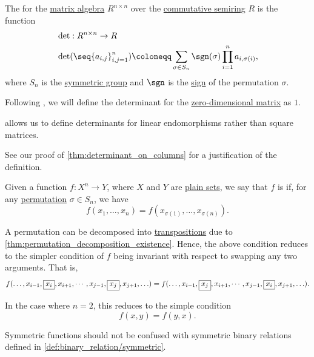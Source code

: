 \begin{definition}\label{def:matrix_determinant}
  The  for the \hyperref[thm:matrix_algebra]{matrix algebra} \( R^{n \times n} \) over the \hyperref[def:semiring/commutative]{commutative semiring} \( R \) is the function
  \begin{equation}\label{eq:def:matrix_determinant}
    \begin{aligned}
      &\det: R^{n \times n} \to R \\
      &\det(\seq{ a_{i,j} }_{i,j=1}^n) \coloneqq \sum_{\sigma \in S_n} \sgn(\sigma) \prod_{i=1}^n a_{i,\sigma(i)},
    \end{aligned}
  \end{equation}
  where \( S_n \) is the \hyperref[def:symmetric_group]{symmetric group} and \( \sgn \) is the \hyperref[def:permutation_parity]{sign} of the permutation \( \sigma \).

  Following \textcite[493]{Eisenbud1995CommutativeAlgebra}, we will define the determinant for the \hyperref[ex:def:array/zero_dimensional]{zero-dimensional matrix} as \( 1 \).

   allows us to define determinants for linear endomorphisms rather than square matrices.

  See our proof of \cref{thm:determinant_on_columns} for a justification of the definition.
\end{definition}

\begin{definition}\label{def:symmetric_function}
  Given a function \( f: X^n \to Y \), where \( X \) and \( Y \) are \hyperref[def:set]{plain sets}, we say that \( f \) is  if, for any \hyperref[def:symmetric_group]{permutation} \( \sigma \in S_n \), we have
  \begin{equation*}
    f(x_1, \ldots, x_n) = f(x_{\sigma(1)}, \ldots, x_{\sigma(n)}).
  \end{equation*}

  A permutation can be decomposed into \hyperref[def:cyclic_permutation]{transpositions} due to \cref{thm:permutation_decomposition_existence}. Hence, the above condition reduces to the simpler condition of \( f \) being invariant with respect to swapping any two arguments. That is,
  \begin{equation*}
    f(\ldots, x_{i-1}, \fbox{\( x_i \)}, x_{i+1}, \cdots, x_{j-1}, \fbox{\( x_j \)}, x_{j+1}, \ldots)
    =
    f(\ldots, x_{i-1}, \fbox{\( x_j \)}, x_{i+1}, \cdots, x_{j-1}, \fbox{\( x_i \)}, x_{j+1}, \ldots).
  \end{equation*}

  In the case where \( n = 2 \), this reduces to the simple condition
  \begin{equation*}
    f(x, y) = f(y, x).
  \end{equation*}

  Symmetric functions should not be confused with symmetric binary relations defined in \cref{def:binary_relation/symmetric}.
\end{definition}

